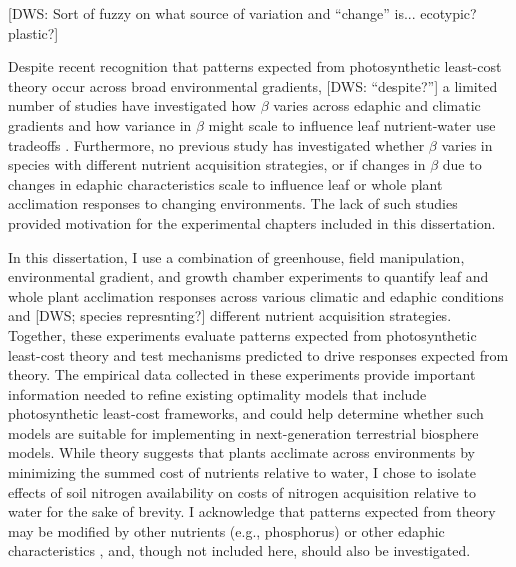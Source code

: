[DWS: Sort of fuzzy on what source of variation and ``change'' is... ecotypic? plastic?]

Despite recent recognition that patterns expected from photosynthetic least-cost theory occur across broad environmental gradients, [DWS: ``despite?''] a limited number of studies have investigated how $\beta$ varies across edaphic and climatic gradients and how variance in $\beta$ might scale to influence leaf nutrient-water use tradeoffs . Furthermore, no previous study has investigated whether $\beta$ varies in species with different nutrient acquisition strategies, or if changes in $\beta$ due to changes in edaphic characteristics scale to influence leaf or whole plant acclimation responses to changing environments. The lack of such studies provided motivation for the experimental chapters included in this dissertation.

In this dissertation, I use a combination of greenhouse, field manipulation, environmental gradient, and growth chamber experiments to quantify leaf and whole plant acclimation responses across various climatic and edaphic conditions and [DWS; species represnting?] different nutrient acquisition strategies. Together, these experiments evaluate patterns expected from photosynthetic least-cost theory and test mechanisms predicted to drive responses expected from theory. The empirical data collected in these experiments provide important information needed to refine existing optimality models that include photosynthetic least-cost frameworks, and could help determine whether such models are suitable for implementing in next-generation terrestrial biosphere models. While theory suggests that plants acclimate across environments by minimizing the summed cost of nutrients relative to water, I chose to isolate effects of soil nitrogen availability on costs of nitrogen acquisition relative to water for the sake of brevity. I acknowledge that patterns expected from theory may be modified by other nutrients (e.g., phosphorus) or other edaphic characteristics , and, though not included here, should also be investigated.


